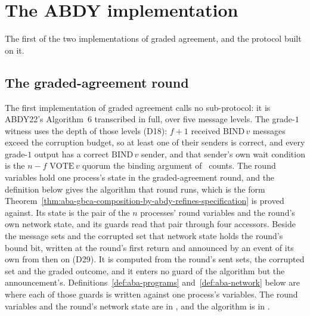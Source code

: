 


\section{The ABDY implementation}
\label{sec:aba-abdy}

The first of the two implementations of graded agreement, and the protocol built on it.

\subsection{The graded-agreement round}

The first implementation of graded agreement calls no sub-protocol: it is ABDY22's Algorithm~6 transcribed in full, over five message levels.
The grade-$1$ witness uses the depth of those levels (D18): $f{+}1$ received $\mathrm{BIND}\,v$ messages exceed the corruption budget, so at least one of their senders is correct, and every grade-$1$ output has a correct $\mathrm{BIND}\,v$ sender, and that sender's own wait condition is the $n{-}f$ $\mathrm{VOTE}\,v$ quorum the binding argument of~\cite{ABDY22} counts.
The round variables hold one process's state in the graded-agreement round, and the definition below gives the algorithm that round runs, which is the form Theorem~\ref{thm:aba-gbca-composition-by-abdy-refines-specification} is proved against.
Its state is the pair of the $n$ processes' round variables and the round's own network state, and its guards read that pair through four accessors.
Beside the message sets and the corrupted set that network state holds the round's bound bit, written at the round's first return and announced by an event of its own from then on (D29).
It is computed from the round's sent sets, the corrupted set and the graded outcome, and it enters no guard of the algorithm but the announcement's.
Definitions~\ref{def:aba-programs} and~\ref{def:aba-network} below are where each of those guards is written against one process's variables.
The round variables and the round's network state are in , and the algorithm is in .





